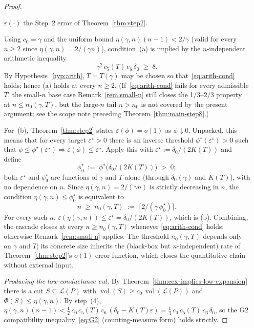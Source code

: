 \begin{proof}
\begin{enumerate}[nosep, label=\textup{(\alph*)}]
  $\varepsilon(\cdot)$ the Step~2 error of Theorem~\ref{thm:step2}.
\end{enumerate}
Using $c_0 = \gamma$ and the uniform bound $\eta(\gamma,n)(n-1)
< 2/\gamma$ (valid for every $n \ge 2$ since $\eta(\gamma,n) =
2/(\gamma n)$), condition~(a) is implied by the $n$-independent
arithmetic inequality
\begin{equation}\label{eq:arith-cond}
  \gamma^2\, c_5(T)\, c_6\, \delta_0 \;\ge\; 8.
\end{equation}
By Hypothesis~\ref{hyp:arith}, $T = T(\gamma)$ may be chosen so
that~\eqref{eq:arith-cond} holds; hence (a) holds at every $n \ge
2$. (If~\eqref{eq:arith-cond} fails for every admissible $T$, the
small-$n$ base case Remark~\ref{rem:small-n} still closes the
1/3--2/3 property at $n \le n_0(\gamma, T)$, but the large-$n$ tail
$n > n_0$ is not covered by the present argument; see the scope
note preceding Theorem~\ref{thm:main-step8}.)

For~(b), Theorem~\ref{thm:step2} states $\varepsilon(\phi) = o(1)$
as $\phi \downarrow 0$. Unpacked, this means that for every target
$\varepsilon^\star > 0$ there is an inverse threshold
$\phi^\star(\varepsilon^\star) > 0$ such that
$\phi \le \phi^\star(\varepsilon^\star) \Rightarrow \varepsilon(\phi)
\le \varepsilon^\star$. Apply this with
$\varepsilon^\star := \delta_0/(2 K(T))$ and define
\[
  \phi^\star_0 \;:=\; \phi^\star\!\big(\delta_0/(2K(T))\big) \;>\; 0;
\]
both $\varepsilon^\star$ and $\phi^\star_0$ are functions of $\gamma$
and $T$ alone (through $\delta_0(\gamma)$ and $K(T)$), with no
dependence on $n$. Since $\eta(\gamma, n) = 2/(\gamma n)$ is strictly
decreasing in $n$, the condition $\eta(\gamma, n) \le \phi^\star_0$
is equivalent to
\begin{equation}\label{eq:n0-def}
  n \;\ge\; n_0(\gamma, T) \;:=\;
  \big\lceil 2/(\gamma\, \phi^\star_0)\big\rceil.
\end{equation}
For every such $n$, $\varepsilon(\eta(\gamma, n)) \le \varepsilon^\star
= \delta_0/(2 K(T))$, which is (b). Combining, the cascade closes at
every $n \ge n_0(\gamma, T)$ whenever \eqref{eq:arith-cond} holds;
otherwise Remark~\ref{rem:small-n} applies. The threshold
$n_0(\gamma, T)$ depends only on $\gamma$ and $T$; its concrete size
inherits the (black-box but $n$-independent) rate of
Theorem~\ref{thm:step2}'s $o(1)$ error function, which closes the
quantitative chain without external input.

\medskip\noindent\emph{Producing the low-conductance cut.} By
Theorem~\ref{thm:cex-implies-low-expansion} there is a cut
$S \subseteq \mathcal{L}(P)$ with
$\operatorname{vol}(S) \ge c_0\, \operatorname{vol}(\mathcal L(P))$
and $\Phi(S) \le \eta(\gamma, n)$. By step~(4),
$\eta(\gamma, n)(n-1) < \tfrac{1}{2}\, c_0\, c_5(T)\, c_6\,
(\delta_0 - K(T)\varepsilon) = \tfrac{1}{4}\, c_0\, c_5(T)\, c_6\,
\delta_0$, so the G2 compatibility inequality~\eqref{eq:G2}
(counting-measure form) holds strictly.


\end{proof}
